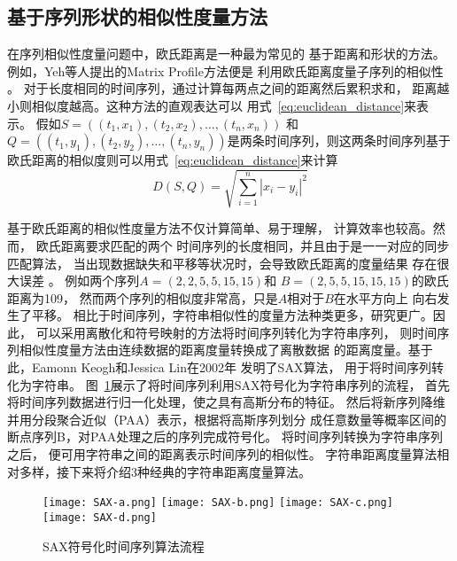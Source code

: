 \subsection{基于序列形状的相似性度量方法}
在序列相似性度量问题中，欧氏距离是一种最为常见的
基于距离和形状的方法。
例如，Yeh等人提出的Matrix Profile方法便是
利用欧氏距离度量子序列的相似性
\cite{DBLP:conf/icdm/YehZUBDDSMK16}。
对于长度相同的时间序列，通过计算每两点之间的距离然后累积求和，
距离越小则相似度越高。这种方法的直观表达可以
用式~\ref{eq:euclidean_distance}来表示。
假如$S=\left(\left(t_1,x_1 \right),\left(t_2,x_2\right),\dots,\left(t_n,x_n\right)\right)$
和$Q=\left(\left(t_1,y_1 \right),\left(t_2,y_2\right),\dots,\left(t_n,y_n\right)\right)$是两条时间序列，则这两条时间序列基于欧氏距离的相似度则可以用式~\ref{eq:euclidean_distance}来计算
\begin{equation}
  D\left(S,Q\right) = \sqrt{\sum_{i=1}^{n}{\left| x_{i}-y_{i} \right|^{2}}}
  \label{eq:euclidean_distance}
\end{equation}

基于欧氏距离的相似性度量方法不仅计算简单、易于理解，
计算效率也较高。然而，
欧氏距离要求匹配的两个
时间序列的长度相同，并且由于是一一对应的同步匹配算法，
当出现数据缺失和平移等状况时，会导致欧氏距离的度量结果
存在很大误差
\cite{DBLP:journals/pvldb/DingTSWK08}。
例如两个序列$A=\left(2,2,5,5,15,15\right)$和
$B=\left(2,5,5,15,15,15\right)$的欧氏距离为109，
然而两个序列的相似度非常高，只是$A$相对于$B$在水平方向上
向右发生了平移。
相比于时间序列，字符串相似性的度量方法种类更多，研究更广。因此，
可以采用离散化和符号映射的方法将时间序列转化为字符串序列，
则时间序列相似性度量方法由连续数据的距离度量转换成了离散数据
的距离度量。基于此，Eamonn Keogh和Jessica Lin在2002年
发明了SAX算法\cite{DBLP:conf/dmkd/LinKLC03}，
用于将时间序列转化为字符串。
图~\ref{fig:SAX}展示了将时间序列利用SAX符号化为字符串序列的流程，
首先将时间序列数据进行归一化处理，使之具有高斯分布的特征。
然后将新序列降维并用分段聚合近似（PAA）表示，根据将高斯序列划分
成任意数量等概率区间的断点序列B，对PAA处理之后的序列完成符号化。
将时间序列转换为字符串序列之后，
便可用字符串之间的距离表示时间序列的相似性。
字符串距离度量算法相对多样，接下来将介绍3种经典的字符串距离度量算法。
\begin{figure}
  \centering
    {\texttt{[image: SAX-a.png]}}
    {\texttt{[image: SAX-b.png]}}
    {\texttt{[image: SAX-c.png]}}
    {\texttt{[image: SAX-d.png]}}
  \caption{SAX符号化时间序列算法流程}
  \label{fig:SAX}
\end{figure}

